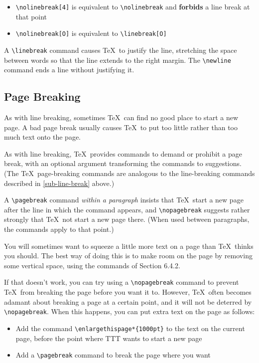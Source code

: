 \documentclass{article}
\newcommand{\justtext}[1]{\texttt{\textbackslash #1}}
\begin{document}
\begin{itemize}
   
   \item \justtext{nolinebreak[4]} is equivalent to \justtext{nolinebreak} and \textbf{forbids} a line break at that point
   
   \item \justtext{nolinebreak[O]} is equivalent to \justtext{linebreak[O]}
\end{itemize}

A \justtext{linebreak} command causes \TeX\ to justify the line, stretching the space between words so that the line extends to the right margin. The \justtext{newline} command ends a line without justifying it.

\subsection{Page Breaking}

As with line breaking, sometimes \TeX\ can find no good place to start a new page. A bad page break
usually causes \TeX\ to put too little rather than too much text onto the page.

As with line breaking, \TeX\ provides commands to demand or prohibit a page break, with an optional
argument transforming the commands to suggestions. (The \TeX\ page-breaking commands are analogous
to the line-breaking commands described in \ref{sub-line-break} above.)

A \justtext{pagebreak} command \emph{within a paragraph} insists that \TeX\ start a new page after
the line in which the command appears, and \justtext{nopagebreak} suggests rather strongly
that \TeX\ not start a new page there. (When used between paragraphs, the commands apply to that
point.)

You will sometimes want to squeeze a little more text on a page than \TeX\ thinks you should. The
best way of doing this is to make room on the page by removing some vertical space, using the
commands of Section 6.4.2.

If that doesn't work, you can try using a \justtext{nopagebreak} command to prevent \TeX\ from
breaking the page before you want it to. However, \TeX\ often becomes adamant about breaking a page
at a certain point, and it will not be deterred by \justtext{nopagebreak}. When this happens, you
can put extra text on the page as follows:

\begin{itemize}
   \item Add the command \justtext{enlargethispage*\{1000pt\}} to the text on the current page,
    before the point where TTT wants to start a new page
   
   \item Add a \justtext{pagebreak} command to break the page where you want
\end{itemize}
\end{document}
